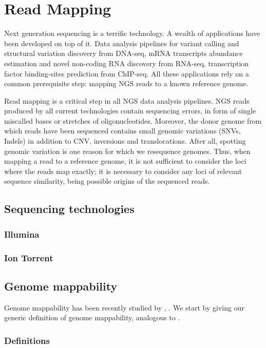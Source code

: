 \chapter{Read Mapping}

Next generation sequencing is a terrific technology.
A wealth of applications have been developed on top of it.
Data analysis pipelines for variant calling and structural variation discovery from DNA-seq, mRNA transcripts abundance estimation and novel non-coding RNA discovery from RNA-seq, transcription factor binding-sites prediction from ChIP-seq.
All these applications rely on a common prerequisite step: mapping NGS reads to a known reference genome.

Read mapping is a critical step in all NGS data analysis pipelines.
NGS reads produced by all current technologies contain sequencing errors, in form of single miscalled bases or stretches of oligonucleotides.
Moreover, the donor genome from which reads have been sequenced contains small genomic variations (SNVs, Indels) in addition to CNV, inversions and translocations.
After all, spotting genomic variation is one reason for which we resequence genomes.
Thus, when mapping a read to a reference genome, it is not sufficient to consider the loci where the reads map exactly; it is necessary to consider any loci of relevant sequence similarity, being possible origins of the sequenced reads.

\section{Sequencing technologies}
\subsection{Illumina}
\subsection{Ion Torrent}

\section{Genome mappability}

Genome mappability has been recently studied by \citep{Derrien2011}, \citep{Lee2012}.
We start by giving our generic definition of genome mappability, analogous to \citep{Derrien2011}.

\subsection{Definitions}

